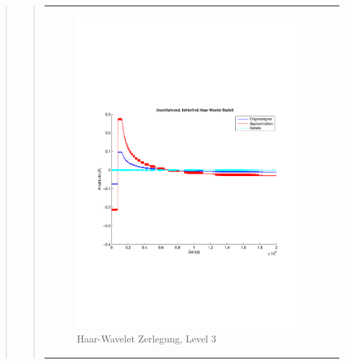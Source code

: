 \begin{quote}
\begin{quote}
       
        \begin{center}
                \begin{tabular}{ll}
    
                \hspace{-8em}
                    \begin{minipage}{0.6\textwidth}
    
                        \begin{figure}[H]
                            \label{fig:}
                            \includegraphics[scale=0.4, trim = 2cm 6cm 1cm
                            7.5cm,
                            clip]{./Bilder/Termin8/fehlerfrei_hochlaufen_Haar_Wavlet_lvl_3}
                            \caption{Haar-Wavelet Zerlegung, Level 3}
                        \end{figure}
    

\end{minipage}
\end{tabular}
\end{center}
\end{quote}
\end{quote}
